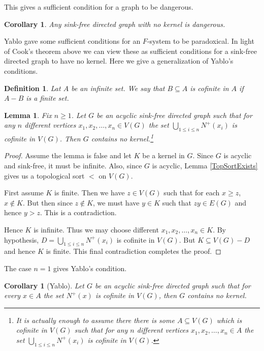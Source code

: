 \documentclass[12pt]{article}
\newtheorem{lem}[thm]{Lemma}
\newtheorem{cor}[thm]{Corollary}
\newtheorem{defn}{Definition}
\theoremstyle{remark}
\begin{document}
This gives a sufficient condition for a graph to be dangerous.
\begin{cor}
Any sink-free directed graph with no kernel is dangerous.
\end{cor}

Yablo gave some sufficient conditions for an $F$-system to be paradoxical.  In light of Cook's theorem above we can view these as sufficient conditions for a sink-free directed graph to have no kernel.  Here we give a generalization of Yablo's conditions.

\begin{defn}
Lat $A$ be an infinite set. We say that $B \subseteq A$ is \emph{cofinite} in $A$ if $A - B$ is a finite set.
\end{defn}

\begin{lem}\label{GeneralizedYabloCondition}
Fix $n \geq 1$.  Let $G$ be an acyclic sink-free directed graph such that for any $n$ different vertices $x_1, x_2, \ldots, x_n \in V(G)$ the set $\bigcup_{1 \leq i \leq n} N^+(x_i)$ is cofinite in $V(G)$.  Then $G$ contains no kernel.\footnote{It is actually enough to assume there there is some $A \subseteq V(G)$ which is cofinite in $V(G)$ such that for any $n$ different vertices $x_1, x_2, \ldots, x_n \in A$ the set $\bigcup_{1 \leq i \leq n} N^+(x_i)$ is cofinite in $V(G)$.}
\end{lem}
\begin{proof}
Assume the lemma is false and let $K$ be a kernel in $G$.  Since $G$ is acyclic and sink-free, it must be infinite.  Also, since $G$ is acyclic, Lemma \ref{TopSortExists} gives us a topological sort $<$ on $V(G)$.\newline 

First assume $K$ is finite.  Then we have $z \in V(G)$ such that for each $x \geq z$, $x \not \in K$.  But then since $z \not \in K$, we must have $y \in K$ such that $zy \in E(G)$ and hence $y > z$. This is a contradiction.\newline

Hence $K$ is infinite. Thus we may choose different $x_1, x_2, \ldots, x_n \in K$.  By hypothesis, $D = \bigcup_{1 \leq i \leq n} N^+(x_i)$ is cofinite in $V(G)$.  But $K \subseteq V(G) - D$ and hence $K$ is finite.  This final contradiction completes the proof.
\end{proof}

The case $n = 1$ gives Yablo's condition.
\begin{cor}[Yablo]
Let $G$ be an acyclic sink-free directed graph such that for every $x \in A$ the set $N^+(x)$ is cofinite in $V(G)$, then $G$ contains no kernel.
\end{cor}
\end{document}
